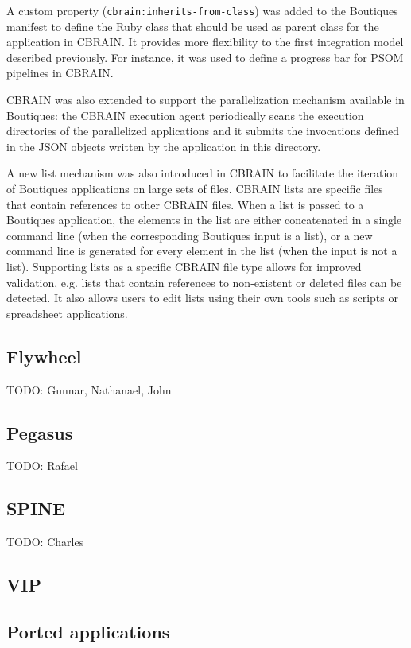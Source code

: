 \documentclass{article}
\newcommand{\todo}[1]{\color{red}TODO: #1\color{black}}
\begin{document}
A custom property (\texttt{cbrain:inherits-from-class}) was added to
the Boutiques manifest to define the Ruby class that should be used as
parent class for the application in CBRAIN. It provides more
flexibility to the first integration model described previously. For
instance, it was used to define a progress bar for PSOM pipelines in
CBRAIN.

CBRAIN was also extended to support the parallelization mechanism
available in Boutiques: the CBRAIN execution agent periodically scans
the execution directories of the parallelized applications and it submits
the invocations defined in the JSON objects written by the
application in this directory.

A new list mechanism was also introduced in CBRAIN to facilitate the
iteration of Boutiques applications on large sets of files. CBRAIN
lists are specific files that contain references to other CBRAIN
files. When a list is passed to a Boutiques application, the elements
in the list are either concatenated in a single command line (when the
corresponding Boutiques input is a list), or a new command line is
generated for every element in the list (when the input is not a
list). Supporting lists as a specific CBRAIN file type allows for
improved validation, e.g. lists that contain references to
non-existent or deleted files can be detected. It also allows users to
edit lists using their own tools such as scripts or spreadsheet
applications.

\subsection{Flywheel}

\todo{Gunnar, Nathanael, John}

\subsection{Pegasus}

\todo{Rafael}

\subsection{SPINE}

\todo{Charles}

\subsection{VIP}


\subsection{Ported applications}
\end{document}
